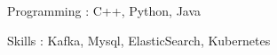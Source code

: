 


\begin{cvskills}


\cvskill
	{Programming : }
	{C++, Python, Java}

\iftrue  %
\cvskill
	{Skills : }
	{Kafka, Mysql, ElasticSearch, Kubernetes}
\fi



\iffalse
\cvskill
{Web : } %
{Ruby on Rails}
\fi

\end{cvskills}

